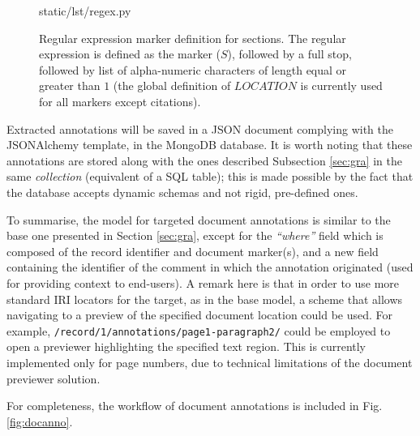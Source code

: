 \begin{figure}[!ht]
  
    {static/lst/regex.py}
    \caption[Regular expression marker definition for sections]
            {Regular expression marker definition for sections. The regular
             expression is defined as the marker ($S$), followed by a full stop,
             followed by list of alpha-numeric characters of length equal or
             greater than $1$ (the global definition of $LOCATION$ is currently
             used for all markers except citations).}
    \label{lst:regex}
\end{figure}

\newpage

Extracted annotations will be saved in a JSON document complying with the
JSONAlchemy template, in the MongoDB database. It is worth noting that these
annotations are stored along with the ones described Subsection \ref{sec:gra}
in the same \textit{collection} (equivalent of a SQL table); this is made
possible by the fact that the database accepts dynamic schemas and not rigid,
pre-defined ones.

To summarise, the model for targeted document annotations is similar to the
base one presented in Section \ref{sec:gra}, except for the \textit{``where''}
field which is composed of the record identifier and document marker(s), and a
new field containing the identifier of the comment in which the annotation
originated (used for providing context to end-users). A remark here is that in
order to use more standard IRI locators for the target, as in the base model, a
scheme that allows navigating to a preview of the specified document location
could be used.  For example, \texttt{/record/1/annotations/page1-paragraph2/}
could be employed to open a previewer highlighting the specified text region.
This is currently implemented only for page numbers, due to technical
limitations of the document previewer solution.

For completeness, the workflow of document annotations is included in Fig.
\ref{fig:docanno}.

